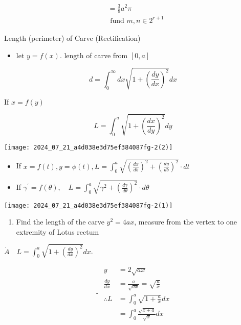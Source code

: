 \documentclass[12pt, a4paper]{article}
\begin{document}
$$
\begin{aligned}
& =\frac{3}{8} a^{2} \pi \\
& \text { fund } m, n \in 2^{r+1}
\end{aligned}
$$

Length (perimeter) of Carve (Rectification)

\begin{itemize}
  \item let $y=f(x)$. length of carve from $[0, a]$
\end{itemize}

$$
d=\int_{0}^{\infty} d x \sqrt{1+\left(\frac{d y}{d x}\right)^{2}} d x
$$

If $x=f(y)$

$$
L=\int_{0}^{a} \sqrt{1+\left(\frac{d x}{d y}\right)^{2}} d y
$$

\begin{center}
\texttt{[image: 2024\_07\_21\_a4d038e3d75ef384087fg-2(2)]}
\end{center}

\begin{itemize}
  \item If $x=f(t), y=\phi(t), L=\int_{0}^{a} \sqrt{\left(\frac{d x}{d b}\right)^{2}+\left(\frac{d y}{d b}\right)^{2}} \cdot d t$
  \item If $\gamma^{\prime}=f(\theta), \quad L=\int_{0}^{a} \sqrt{\gamma^{2}+\left(\frac{d \gamma}{d \theta}\right)^{2}} \cdot d \theta$
\end{itemize}

\begin{center}
\texttt{[image: 2024\_07\_21\_a4d038e3d75ef384087fg-2(1)]}
\end{center}

\begin{enumerate}
  \item Find the length of the carve $y^{2}=4 a x$, measure from the vertex to one extremity of Lotus rectum
\end{enumerate}

$\dot{A} \quad L=\int_{0}^{a} \sqrt{1+\left(\frac{d y}{d x}\right)^{2}} d x$.

$$
\text { - } \begin{aligned}
y & =2 \sqrt{a x} \\
\frac{d y}{d x} & =\frac{a}{\sqrt{a x}}=\sqrt{\frac{a}{x}} \\
\therefore L & =\int_{0}^{a} \sqrt{1+\frac{a}{x}} d x \\
& =\int_{0}^{a} \frac{\sqrt{x+a}}{\sqrt{x}} d x
\end{aligned}
$$
\end{document}
